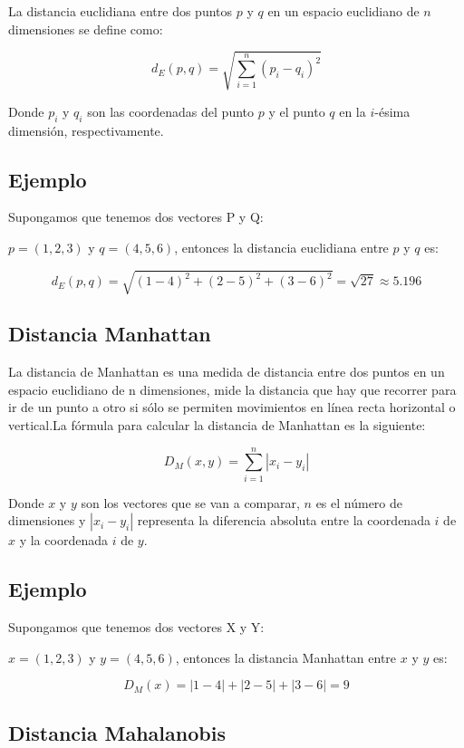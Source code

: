 \documentclass[
]{article}
\begin{document}
La distancia euclidiana entre dos puntos \(p\) y \(q\) en un espacio
euclidiano de \(n\) dimensiones se define como:

\[ d_E(p,q) = \sqrt{\sum_{i=1}^{n} (p_i - q_i)^2} \]

Donde \(p_i\) y \(q_i\) son las coordenadas del punto \(p\) y el punto
\(q\) en la \(i\)-ésima dimensión, respectivamente.

\hypertarget{ejemplo-3}{%
\subsection{Ejemplo}\label{ejemplo-3}}

Supongamos que tenemos dos vectores P y Q:

\(p = (1, 2, 3)\) y \(q = (4, 5, 6)\), entonces la distancia euclidiana
entre \(p\) y \(q\) es:

\[ d_E(p,q) = \sqrt{(1-4)^2 + (2-5)^2 + (3-6)^2} = \sqrt{27} \approx 5.196 \]

\hypertarget{distancia-manhattan}{%
\subsection{Distancia Manhattan}\label{distancia-manhattan}}

La distancia de Manhattan es una medida de distancia entre dos puntos en
un espacio euclidiano de n dimensiones, mide la distancia que hay que
recorrer para ir de un punto a otro si sólo se permiten movimientos en
línea recta horizontal o vertical.La fórmula para calcular la distancia
de Manhattan es la siguiente:

\[ D_M(x, y) = \sum_{i=1}^{n} |x_i - y_i| \]

Donde \(x\) y \(y\) son los vectores que se van a comparar, \(n\) es el
número de dimensiones y \(|x_i - y_i|\) representa la diferencia
absoluta entre la coordenada \(i\) de \(x\) y la coordenada \(i\) de
\(y\).

\hypertarget{ejemplo-4}{%
\subsection{Ejemplo}\label{ejemplo-4}}

Supongamos que tenemos dos vectores X y Y:

\(x = (1, 2, 3)\) y \(y = (4, 5, 6)\), entonces la distancia Manhattan
entre \(x\) y \(y\) es:

\[ D_M(x) = |1 - 4| + |2 - 5| + |3 - 6| = 9 \]

\hypertarget{distancia-mahalanobis}{%
\subsection{Distancia Mahalanobis}\label{distancia-mahalanobis}}
\end{document}
